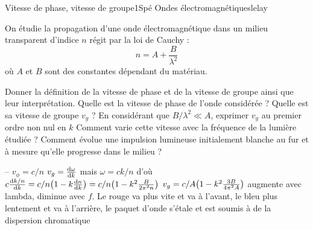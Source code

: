 \begin{exercise}{Vitesse de phase, vitesse de groupe}{1}{Spé}
{Ondes électromagnétiques}{lelay}

On étudie la propagation d'une onde électromagnétique dans un milieu transparent d'indice $n$ régit par la loi de Cauchy : 
$$
n = A + \frac{B}{\lambda^2}
$$
où $A$ et $B$ sont des constantes dépendant du matériau.
\begin{questions}
    \questioncours Donner la définition de la vitesse de phase et de la vitesse de groupe ainsi que leur interprétation.
    \question Quelle est la vitesse de phase de l'onde considérée ?
    \question Quelle est sa vitesse de groupe $v_g$ ?
    \question En considérant que $B/\lambda^2 \ll A$, exprimer $v_g$ au premier ordre non nul en $k$
    \question Comment varie cette vitesse avec la fréquence de la lumière étudiée ? Comment évolue une impulsion lumineuse initialement blanche au fur et à mesure qu'elle progresse dans le milieu ?
\end{questions}

\end{exercise}

\begin{solution}

\begin{questions}
    \questioncours --
    \question $v_\phi = c/n$
    \question $v_g=\dv{\omega}{k}$ mais $\omega = ck/n$ d'où $c\dv{k/n}{k} = c/n\qty(1 -k \dv{n}{k}) = c/n\qty(1-k^2\frac{B}{2\pi^2 n})$
    \question $ v_g= c/A\qty(1-k^2\frac{3B}{4\pi^2 A})$
    \question augmente avec lambda, diminue avec $f$. Le rouge va plus vite et va à l'avant, le bleu plus lentement et va à l'arrière, le paquet d'onde s'étale et est soumis à de la dispersion chromatique
\end{questions}
\end{solution}